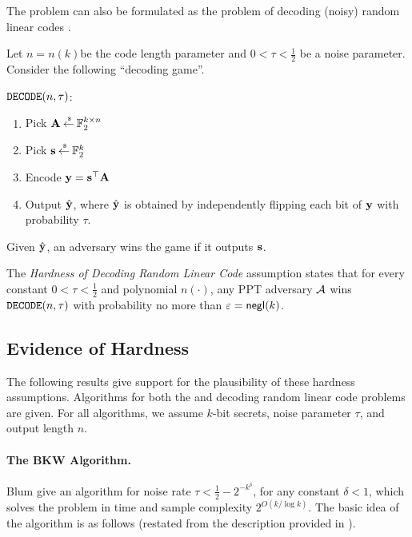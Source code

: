 The \LPN problem can also be formulated as the problem of decoding (noisy) random linear codes \cite{applebaum2008fast}.
\begin{definition}
	Let $n = n(k)$be the code length parameter and $0 < \tau < \frac{1}{2}$ be a noise parameter.
	Consider the following ``decoding game''.
	\begin{boxedalgo}
		$\mathtt{DECODE}(n,\tau)$:
		\vspace*{-8pt}
		\begin{enumerate}
			\itemsep-2pt
			\item Pick ${\mathbf A} \mathbin{\stackrel{\mbox{\,\tiny \$}}{\gets}} {\mathbb F}_2^{k\times n}$
			\item Pick ${\mathbf s} \mathbin{\stackrel{\mbox{\,\tiny \$}}{\gets}} {\mathbb F}_2^{k}$
			\item Encode ${\mathbf y} = {\mathbf s}^\top{\mathbf A}$
			\item Output $\hat{{\mathbf y}}$, where $\hat{{\mathbf y}}$ is obtained by independently flipping each bit of ${\mathbf y}$ with probability $\tau$.
		\end{enumerate}
	Given $\hat{{\mathbf y}}$, an adversary \cA wins the game if it outputs ${\mathbf s}$.
	\end{boxedalgo}

	The {\em Hardness of Decoding Random Linear Code} assumption states that for every constant $0 < \tau < \frac{1}{2}$ and polynomial $n(\cdot)$, any PPT adversary ${\mathcal A}$ wins $\mathtt{DECODE}(n,\tau)$ with probability no more than $\varepsilon = \mathsf{negl}(k)$. 
\end{definition}

\subsection{Evidence of Hardness}\label{sec:hardness}

The following results give support for the plausibility of these hardness assumptions.
Algorithms for both the \LPN and decoding random linear code problems are given.
For all algorithms, we assume $k$-bit secrets, noise parameter $\tau$, and output length $n$.


\paragraph{The BKW Algorithm.} Blum \etal \cite{STOC:BluKalWas00} give an algorithm for noise rate $\tau < \frac{1}{2} - 2^{-k^\delta}$, for any constant $\delta < 1$, which solves the \LPN problem in time and sample complexity $2^{O(k/\log k)}$.
The basic idea of the algorithm is as follows (restated from the description provided in \cite[Section 2]{Levieil06}).

